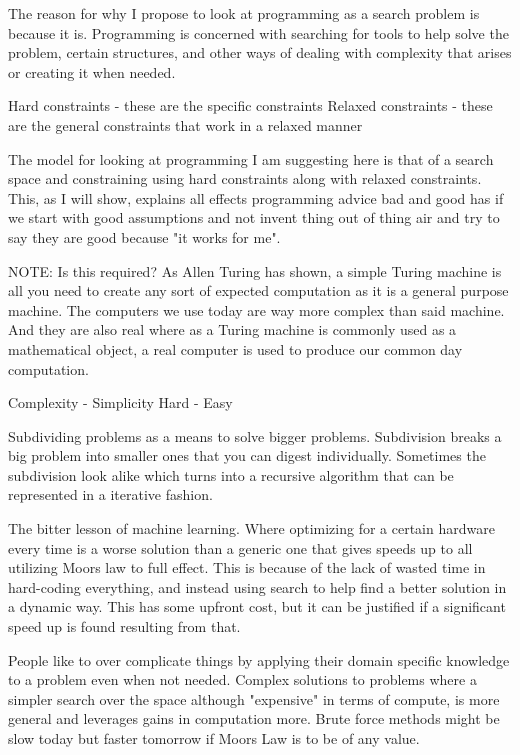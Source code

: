 \documentclass[a4paper]{article}
\begin{document}
The reason for why I propose to look at programming as a search problem is because it is. 
Programming is concerned with searching for tools to help solve the problem, certain 
structures, and other ways of dealing with complexity that arises or creating it when needed. 

Hard constraints - these are the specific constraints
Relaxed constraints - these are the general constraints that work in a relaxed manner

The model for looking at programming I am suggesting here is that of a search space and constraining using hard constraints along with relaxed constraints. This, as I will show, explains all effects programming advice bad and good has if we start with good assumptions and not invent thing out of thing air and try to say they are good because "it works for me". 

NOTE: Is this required? 
As Allen Turing has shown, a simple Turing machine is all you need to create any sort of expected computation as it is a general purpose machine. The computers we use today are way more complex than said machine. And they are also real where as a Turing machine is commonly used as a mathematical object, a real computer is used to produce our common day computation.


Complexity - Simplicity 
Hard - Easy 

Subdividing problems as a means to solve bigger problems. Subdivision breaks a big problem into smaller ones that you can digest individually. Sometimes the subdivision look alike which turns into a recursive algorithm that can be represented in a iterative fashion. 

The bitter lesson of machine learning. Where optimizing for a certain hardware every time is a worse solution than a generic one that gives speeds up to all utilizing Moors law to full effect. This is because of the lack of wasted time in hard-coding everything, and instead using search to help find a better solution in a dynamic way. This has some upfront cost, but it can be justified if a significant speed up is found resulting from that. 

People like to over complicate things by applying their domain specific knowledge to a problem 
even when not needed. 
Complex solutions to problems where a simpler search over the space 
although "expensive" in terms of compute, is more general and leverages gains in computation 
more. Brute force methods might be slow today but faster tomorrow if Moors Law is to be of 
any value.
\end{document}
